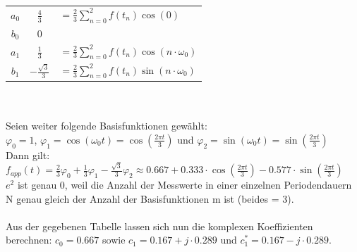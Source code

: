 	\begin{tabular}{c | c l}
		$a_0$ & $\frac{4}{3}$			&$= \frac{2}{3}\sum_{n=0}^2f(t_n)\cos\left(0\right)$\\
		$b_0$ & $0$ & \\
		$a_1$ & $\frac{1}{3}$			&$= \frac{2}{3}\sum_{n=0}^2f(t_n)\cos\left(n\cdot \omega_0\right)$\\
		$b_1$ & $-\frac{\sqrt{3}}{3}$	&$= \frac{2}{3}\sum_{n=0}^2f(t_n)\sin\left(n\cdot \omega_0\right)$
	\end{tabular}\\
	\\
	Seien weiter folgende Basisfunktionen gewählt:\\
	$\varphi _0 = 1$, $\varphi _1 = \cos(\omega _0t) = \cos\left(\frac{2\pi t}{3}\right)$ und  $\varphi _2 = \sin(\omega _0t) = \sin\left(\frac{2\pi t}{3}\right)$\\
	Dann gilt:
	$f_{app}(t) = \frac{2}{3}\varphi_0 + \frac{1}{3}\varphi_1 - \frac{\sqrt{3}}{3}\varphi_2 \approx 0.667 + 0.333\cdot \cos\left(\frac{2\pi t}{3}\right) - 0.577\cdot \sin\left(\frac{2\pi t}{3}\right)$\\
	$e^2$ ist genau 0, weil die Anzahl der Messwerte in einer einzelnen Periodendauern N genau gleich der Anzahl der Basisfunktionen m ist (beides = 3).\\
	\\
	Aus der gegebenen Tabelle lassen sich nun die komplexen Koeffizienten berechnen: $c_0 = 0.667$ sowie $c_1 = 0.167 + j\cdot 0.289$ und $c_1^* = 0.167 - j\cdot 0.289$.\\
